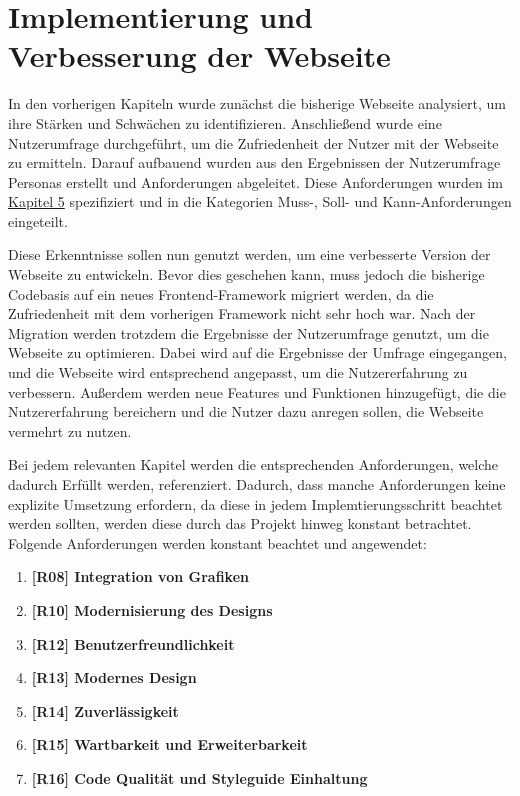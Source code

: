 
\chapter{Implementierung und Verbesserung der Webseite}
\label{chapter:6}

In den vorherigen Kapiteln wurde zunächst die bisherige Webseite analysiert, um ihre Stärken und Schwächen zu identifizieren.
Anschließend wurde eine Nutzerumfrage durchgeführt, um die Zufriedenheit der Nutzer mit der Webseite zu ermitteln.
Darauf aufbauend wurden aus den Ergebnissen der Nutzerumfrage Personas erstellt und Anforderungen abgeleitet.
Diese Anforderungen wurden im \hyperref[chapter:5]{Kapitel 5} spezifiziert und in die Kategorien Muss-, Soll- und Kann-Anforderungen eingeteilt.

Diese Erkenntnisse sollen nun genutzt werden, um eine verbesserte Version der Webseite zu entwickeln.
Bevor dies geschehen kann, muss jedoch die bisherige Codebasis auf ein neues Frontend-Framework migriert werden, da die Zufriedenheit mit dem vorherigen Framework nicht sehr hoch war.
Nach der Migration werden trotzdem die Ergebnisse der Nutzerumfrage genutzt, um die Webseite zu optimieren.
Dabei wird auf die Ergebnisse der Umfrage eingegangen, und die Webseite wird entsprechend angepasst, um die Nutzererfahrung zu verbessern.
Außerdem werden neue Features und Funktionen hinzugefügt, die die Nutzererfahrung bereichern und die Nutzer dazu anregen sollen, die Webseite vermehrt zu nutzen.

Bei jedem relevanten Kapitel werden die entsprechenden Anforderungen, welche dadurch Erfüllt werden, referenziert.
Dadurch, dass manche Anforderungen keine explizite Umsetzung erfordern, da diese in jedem Implemtierungsschritt beachtet werden sollten, werden diese durch das Projekt hinweg konstant betrachtet.
Folgende Anforderungen werden konstant beachtet und angewendet:

\begin{enumerate}

    \item \textbf{[R08] Integration von Grafiken}
    \item \textbf{[R10] Modernisierung des Designs}
    \item \textbf{[R12] Benutzerfreundlichkeit}
    \item \textbf{[R13] Modernes Design}
    \item \textbf{[R14] Zuverlässigkeit}
    \item \textbf{[R15] Wartbarkeit und Erweiterbarkeit}
    \item \textbf{[R16] Code Qualität und Styleguide Einhaltung}

\end{enumerate}


